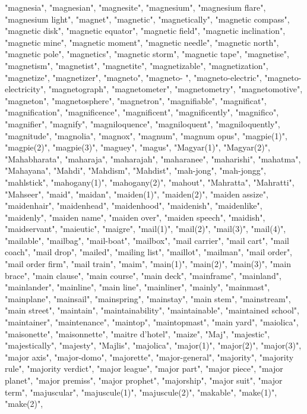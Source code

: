 "magnesia",
"magnesian",
"magnesite",
"magnesium",
"magnesium flare",
"magnesium light",
"magnet",
"magnetic",
"magnetically",
"magnetic compass",
"magnetic disk",
"magnetic equator",
"magnetic field",
"magnetic inclination",
"magnetic mine",
"magnetic moment",
"magnetic needle",
"magnetic north",
"magnetic pole",
"magnetics",
"magnetic storm",
"magnetic tape",
"magnetise",
"magnetism",
"magnetist",
"magnetite",
"magnetizable",
"magnetization",
"magnetize",
"magnetizer",
"magneto",
"magneto- ",
"magneto-electric",
"magneto-electricity",
"magnetograph",
"magnetometer",
"magnetometry",
"magnetomotive",
"magneton",
"magnetosphere",
"magnetron",
"magnifiable",
"magnificat",
"magnification",
"magnificence",
"magnificent",
"magnificently",
"magnifico",
"magnifier",
"magnify",
"magniloquence",
"magniloquent",
"magniloquently",
"magnitude",
"magnolia",
"magnox",
"magnum",
"magnum opus",
"magpie(1)",
"magpie(2)",
"magpie(3)",
"maguey",
"magus",
"Magyar(1)",
"Magyar(2)",
"Mahabharata",
"maharaja",
"maharajah",
"maharanee",
"maharishi",
"mahatma",
"Mahayana",
"Mahdi",
"Mahdism",
"Mahdist",
"mah-jong",
"mah-jongg",
"mahlstick",
"mahogany(1)",
"mahogany(2)",
"mahout",
"Mahratta",
"Mahratti",
"Mahseer",
"maid",
"maidan",
"maiden(1)",
"maiden(2)",
"maiden assize",
"maidenhair",
"maidenhead",
"maidenhood",
"maidenish",
"maidenlike",
"maidenly",
"maiden name",
"maiden over",
"maiden speech",
"maidish",
"maidservant",
"maieutic",
"maigre",
"mail(1)",
"mail(2)",
"mail(3)",
"mail(4)",
"mailable",
"mailbag",
"mail-boat",
"mailbox",
"mail carrier",
"mail cart",
"mail coach",
"mail drop",
"mailed",
"mailing list",
"maillot",
"mailman",
"mail order",
"mail order firm",
"mail train",
"maim",
"main(1)",
"main(2)",
"main(3)",
"main brace",
"main clause",
"main course",
"main deck",
"mainframe",
"mainland",
"mainlander",
"mainline",
"main line",
"mainliner",
"mainly",
"mainmast",
"mainplane",
"mainsail",
"mainspring",
"mainstay",
"main stem",
"mainstream",
"main street",
"maintain",
"maintainability",
"maintainable",
"maintained school",
"maintainer",
"maintenance",
"maintop",
"maintopmast",
"main yard",
"maiolica",
"maisonette",
"maisonnette",
"maitre d'hotel",
"maize",
"Maj",
"majestic",
"majestically",
"majesty",
"Majlis",
"majolica",
"major(1)",
"major(2)",
"major(3)",
"major axis",
"major-domo",
"majorette",
"major-general",
"majority",
"majority rule",
"majority verdict",
"major league",
"major part",
"major piece",
"major planet",
"major premiss",
"major prophet",
"majorship",
"major suit",
"major term",
"majuscular",
"majuscule(1)",
"majuscule(2)",
"makable",
"make(1)",
"make(2)",
